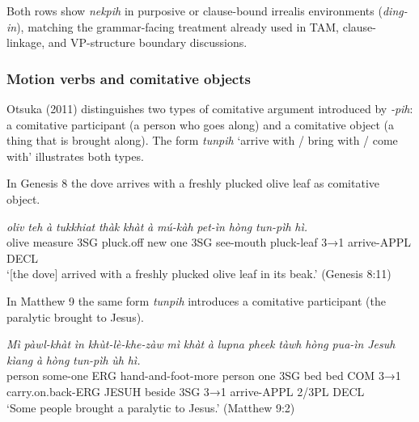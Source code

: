 \documentclass[
  11pt,
  a4paper,
]{article}
\newcommand{\tdim}[1]{\textit{#1}}
\newcommand{\tdimword}[1]{\textit{#1}}
\renewcommand{\textsc}[1]{{\footnotesize\MakeUppercase{#1}}}
\newcommand{\glossquote}[1]{`#1'}
\begin{document}
Both rows show \tdim{nekpih} in purposive or clause-bound irrealis
environments (\tdim{ding-in}), matching the grammar-facing treatment
already used in TAM, clause-linkage, and VP-structure boundary
discussions.

\subsubsection{Motion verbs and comitative
objects}\label{motion-verbs-and-comitative-objects}

Otsuka (2011) distinguishes two types of comitative argument introduced
by \tdim{-pih}: a comitative participant (a person who goes along) and a
comitative object (a thing that is brought along). The form
\tdim{tunpih} \glossquote{arrive with / bring with / come with}
illustrates both types.

In Genesis 8 the dove arrives with a freshly plucked olive leaf as
comitative object.

\begin{exe}
\ex \label{ex:pih-motion-tunpih-gen8}
\gll \tdimword{oliv} \tdimword{teh} \tdimword{à} \tdimword{tukkhiat} \tdimword{thàk} \tdimword{khàt} \tdimword{à} \tdimword{mú-kàh} \tdimword{pet-ìn} \tdimword{hòng} \tdimword{tun-pìh} \tdimword{hì.} \\
     olive measure \textsc{3sg} pluck.off new one \textsc{3sg} see-mouth pluck-leaf \textsc{3→1} arrive-\textsc{appl} \textsc{decl} \\
\glt \glossquote{[the dove] arrived with a freshly plucked olive leaf in its beak.} (Genesis 8:11)
\end{exe}

In Matthew 9 the same form \tdim{tunpih} introduces a comitative
participant (the paralytic brought to Jesus).

\begin{exe}
\ex \label{ex:pih-motion-tunpih-matt9}
\gll \tdimword{Mì} \tdimword{pàwl-khàt} \tdimword{ìn} \tdimword{khùt-lè-khe-zàw} \tdimword{mì} \tdimword{khàt} \tdimword{à} \tdimword{lupna} \tdimword{pheek} \tdimword{tàwh} \tdimword{hòng} \tdimword{pua-ìn} \tdimword{Jesuh} \tdimword{kìang} \tdimword{à} \tdimword{hòng} \tdimword{tun-pìh} \tdimword{ùh} \tdimword{hì.} \\
     person some-one \textsc{erg} hand-and-foot-more person one \textsc{3sg} bed bed \textsc{com} \textsc{3→1} carry.on.back-\textsc{erg} \textsc{jesuh} beside \textsc{3sg} \textsc{3→1} arrive-\textsc{appl} 2/3PL \textsc{decl} \\
\glt \glossquote{Some people brought a paralytic to Jesus.} (Matthew 9:2)
\end{exe}
\end{document}

